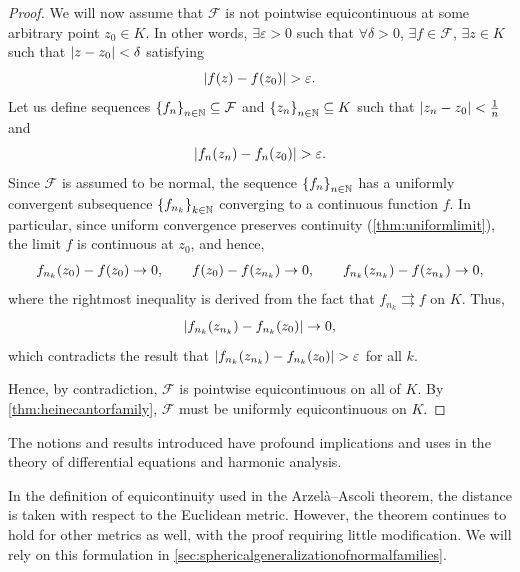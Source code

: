 \begin{proof}
    We will now assume that \(\mathcal{F}\) is not pointwise equicontinuous at some arbitrary point \(z_0\in K\). In other words, \(\exists\varepsilon>0\) such that \(\forall\delta>0\), \(\exists f\in\mathcal{F}\), \(\exists z\in K\) such that \(\abs{z-z_0}<\delta\) satisfying \[\abs{f(z)-f(z_0)}>\varepsilon.\]
    Let us define sequences \(\cbraces{f_n}_{n\in\mathbb{N}}\subseteq\mathcal{F}\) and \(\cbraces{z_n}_{n\in\mathbb{N}}\subseteq K\) such that \(\abs{z_n-z_0}<\frac{1}{n}\) and
    \[\abs{f_n\qty(z_n)-f_n\qty(z_0)}>\varepsilon.\]
    Since \(\mathcal{F}\) is assumed to be normal, the sequence \(\cbraces{f_n}_{n\in\mathbb{N}}\) has a uniformly convergent subsequence \(\cbraces{f_{n_k}}_{k\in\mathbb{N}}\) converging to a continuous function \(f\). In particular, since uniform convergence preserves continuity (\cref{thm:uniformlimit}), the limit \(f\) is continuous at \(z_0\), and hence,
    \[f_{n_k}\qty(z_0)-f\qty(z_0)\to 0,\qquad f\qty(z_0)-f\qty(z_{n_k})\to 0,\qquad f_{n_k}\qty(z_{n_k})-f\qty(z_{n_k})\to 0,\] where the rightmost inequality is derived from the fact that \(f_{n_k}\rightrightarrows f\) on \(K\). Thus,
    \[\abs{f_{n_k}\qty(z_{n_k})-f_{n_k}\qty(z_0)}\to 0,\]
    which contradicts the result that \(\abs{f_{n_k}\qty(z_{n_k})-f_{n_k}\qty(z_0)}>\varepsilon\) for all \(k\).

    Hence, by contradiction, \(\mathcal{F}\) is pointwise equicontinuous on all of \(K\). By \cref{thm:heinecantorfamily}, \(\mathcal{F}\) must be uniformly equicontinuous on \(K\).
\end{proof}
The notions and results introduced have profound implications and uses in the theory of differential equations and harmonic analysis.

In the definition of equicontinuity used in the Arzelà--Ascoli theorem, the distance is taken with respect to the Euclidean metric. However, the theorem continues to hold for other metrics as well, with the proof requiring little modification. We will rely on this formulation in \cref{sec:sphericalgeneralizationofnormalfamilies}.

